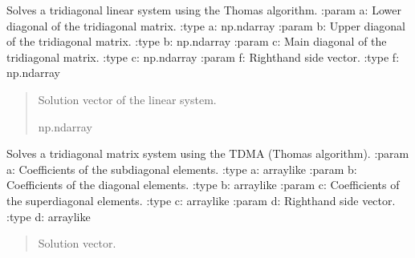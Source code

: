 \documentclass[a4paper,11pt,english,openany]{sphinxmanual}
\begin{document}
\begin{fulllineitems}
\begin{quote}
\begin{description}
\begin{itemize}
\end{itemize}

\end{description}\end{quote}

\begin{fulllineitems}
\label{\detokenize{api/spyice.models.advection_diffusion:spyice.models.advection_diffusion.AdvectionDiffusion.Buffosolver}}
\pysigstartsignatures
{}
\pysigstopsignatures
\sphinxAtStartPar
Solves a tridiagonal linear system using the Thomas algorithm.
:param a: Lower diagonal of the tridiagonal matrix.
:type a: np.ndarray
:param b: Upper diagonal of the tridiagonal matrix.
:type b: np.ndarray
:param c: Main diagonal of the tridiagonal matrix.
:type c: np.ndarray
:param f: Right\sphinxhyphen{}hand side vector.
:type f: np.ndarray
\begin{quote}\begin{description}
\sphinxAtStartPar
Solution vector of the linear system.

\sphinxAtStartPar
np.ndarray

\end{description}\end{quote}

\end{fulllineitems}


\begin{fulllineitems}
\label{\detokenize{api/spyice.models.advection_diffusion:spyice.models.advection_diffusion.AdvectionDiffusion.TDMAsolver}}
\pysigstartsignatures
{}
\pysigstopsignatures
\sphinxAtStartPar
Solves a tridiagonal matrix system using the TDMA (Thomas algorithm).
:param a: Coefficients of the sub\sphinxhyphen{}diagonal elements.
:type a: array\sphinxhyphen{}like
:param b: Coefficients of the diagonal elements.
:type b: array\sphinxhyphen{}like
:param c: Coefficients of the super\sphinxhyphen{}diagonal elements.
:type c: array\sphinxhyphen{}like
:param d: Right\sphinxhyphen{}hand side vector.
:type d: array\sphinxhyphen{}like
\begin{quote}\begin{description}
\sphinxAtStartPar
Solution vector.


\end{description}
\end{quote}
\end{fulllineitems}
\end{fulllineitems}
\end{document}
